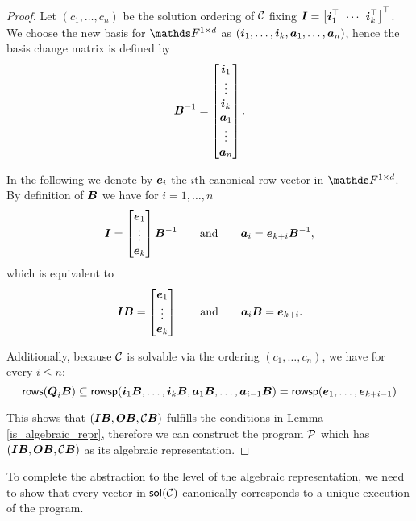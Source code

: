 \begin{proof}
Let $(c_1, \dots, c_n)$ be the solution ordering of $\C$ fixing $\I = \mtdts \vi k$.
We choose the new basis for $\Frowsp$ as $(\dts \vi k, \dts \va n)$, hence the basis change matrix is defined by
\[
    \B^{-1} = 
    \begin{bmatrix}
\vi_1 \\
\vdots \\
\vi_k \\
\va_1 \\
\vdots \\
\va_n
    \end{bmatrix}.
\]

In the following we denote by $\v e_i$ the $i$th canonical row vector in $\Frowsp$.
By definition of $\B$ we have for $i=1, \dots, n$
\begin{equation*}
\I = \begin{bmatrix}
    \v e_1 \\
    \vdots \\
    \v e_k
\end{bmatrix} \B^{-1}
\qquad \textrm{and} \qquad
\va_i = \v e_{k+i} \B^{-1},
\end{equation*}
which is equivalent to
\begin{equation*}
\I \B = \begin{bmatrix}
    \v e_1 \\
    \vdots \\
    \v e_k
\end{bmatrix}
\qquad \textrm{and} \qquad
\va_i \B = \v e_{k+i}.
\end{equation*}

Additionally, because $\C$ is solvable via the ordering $(c_1, \dots, c_n)$,
we have for every $i \leq n$:
\[
\rows(\Q_i \B) \subseteq \rowsp(\vi_1 \B, \dots, \vi_k \B, \va_1 \B, \dots, \va_{i-1} \B) = \rowsp(\dts \ve {k+i-1})
\]

This shows that $(\I\B, \O\B, \C\B)$ fulfills the conditions in Lemma \ref{is_algebraic_repr},
therefore we can construct the program $\P$ which has $(\I\B, \O\B, \C\B)$ as its algebraic representation.
\end{proof}

To complete the abstraction to the level of the algebraic representation,
we need to show that every vector in $\sol(\C)$ canonically corresponds to a unique execution of the program.

